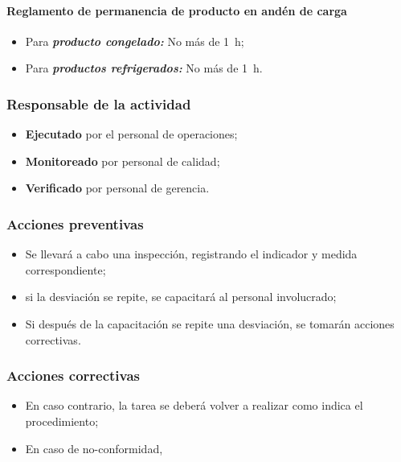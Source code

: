 \paragraph{Reglamento de permanencia de producto en andén de carga}

\begin{itemize}
	\item Para \emph{\textbf{producto congelado:}} No más de \qty{1}{\hour};
	\item Para \emph{\textbf{productos refrigerados:}} No más de \qty{1}{\hour}.
\end{itemize}


\subsubsection{Responsable de la actividad}

\begin{itemize}
	\item \textbf{Ejecutado} por el personal de operaciones;
	\item \textbf{Monitoreado} por personal de calidad;
	\item \textbf{Verificado} por personal de gerencia.
\end{itemize}

\subsubsection{Acciones preventivas}

\begin{itemize}
	\item Se llevará a cabo una inspección, registrando el indicador y medida correspondiente;
	\item si la desviación se repite, se capacitará al personal involucrado;
	\item Si después de la capacitación se repite una desviación, se tomarán acciones correctivas.
\end{itemize}

\subsubsection{Acciones correctivas}

\begin{itemize}
	\item En caso contrario, la tarea se deberá volver a realizar como indica el procedimiento;%
	\item En caso de no-conformidad, %
\end{itemize}

